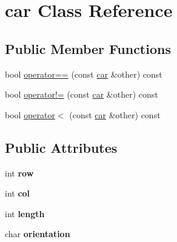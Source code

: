 \hypertarget{classcar}{\section{car Class Reference}
\label{classcar}
}
\subsection*{Public Member Functions}
\begin{DoxyCompactItemize}
\item 
bool \hyperlink{classcar_aed40583451e71dec41144d2f908253d5}{operator==} (const \hyperlink{classcar}{car} \&other) const 
\item 
bool \hyperlink{classcar_adc3d9a25a4f6c719779eede098c2d53c}{operator!=} (const \hyperlink{classcar}{car} \&other) const 
\item 
bool \hyperlink{classcar_a201618c06e88f40ea3e7282851676e73}{operator$<$} (const \hyperlink{classcar}{car} \&other) const 
\end{DoxyCompactItemize}
\subsection*{Public Attributes}
\begin{DoxyCompactItemize}
\item 
\hypertarget{classcar_a6c6fb693d948ae5a64fbf9b0ac0fe3a8}{int {\bfseries row}}\label{classcar_a6c6fb693d948ae5a64fbf9b0ac0fe3a8}

\item 
\hypertarget{classcar_a2358c6b8d0851d70ed905baf67c93a0e}{int {\bfseries col}}\label{classcar_a2358c6b8d0851d70ed905baf67c93a0e}

\item 
\hypertarget{classcar_af77eb16f45c7e3636dbb0ad2fe9f1ae5}{int {\bfseries length}}\label{classcar_af77eb16f45c7e3636dbb0ad2fe9f1ae5}

\item 
\hypertarget{classcar_ac7ca22f7e9d58e8cf7e1c9f178a999a6}{char {\bfseries orientation}}\label{classcar_ac7ca22f7e9d58e8cf7e1c9f178a999a6}

\end{DoxyCompactItemize}


